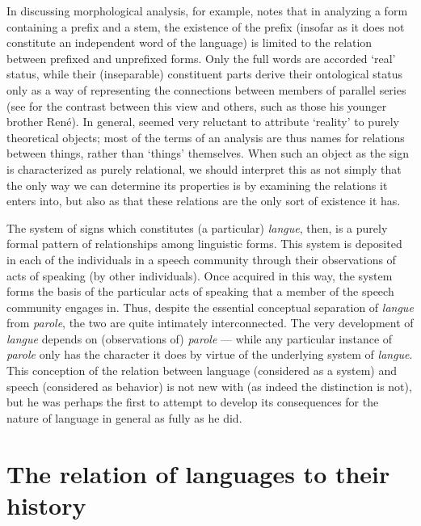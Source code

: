 In discussing morphological analysis, for example, {\Saussure} notes that
in analyzing a form containing a prefix and a stem, the existence of
the prefix (insofar as it does not constitute an independent word of
the language) is limited to the relation between prefixed and
unprefixed forms.  Only the full words are accorded `real' status,
while their (inseparable) constituent parts derive their ontological
status only as a way of representing the connections between members
of parallel series (see \citet{sra18:f.vs.r.saussure} for the {contrast}
between this view and others, such as those his younger brother René).
In general, {\Saussure} seemed very reluctant to attribute `reality' to
purely theoretical objects; most of the terms of an analysis are thus
names for relations between things, rather than `things' themselves.
When such an object as the sign is characterized as purely relational,
we should interpret this as  not simply that the only way we
can determine its properties is by examining the relations it enters
into, but also as  that these relations are the only sort of
existence it has.

The system of signs which constitutes (a particular)
\emph{langue}, then, is a purely formal pattern of relationships
among linguistic forms. This system is deposited in each of the
individuals in a speech community through their observations of acts
of speaking (by other individuals).  Once acquired in this way, the
system forms the basis of the particular acts of speaking that a
member of the speech community engages in.  Thus, despite the
essential conceptual separation of \emph{langue} from
\emph{parole}, the two are quite intimately interconnected. The
very development of \emph{langue} depends on (observations of)
\emph{parole} --- while any particular instance of \emph{parole}
only has the character it does by virtue of the underlying system of
\emph{langue}.  This conception of the relation between language
(considered as a system) and speech (considered as behavior) is not
new with {\Saussure} (as indeed the distinction is not), but he was
perhaps the first to attempt to develop its consequences for the
nature of language in general as fully as he did.

\section{The relation of languages to their history}
\label{sec:diachrony}


